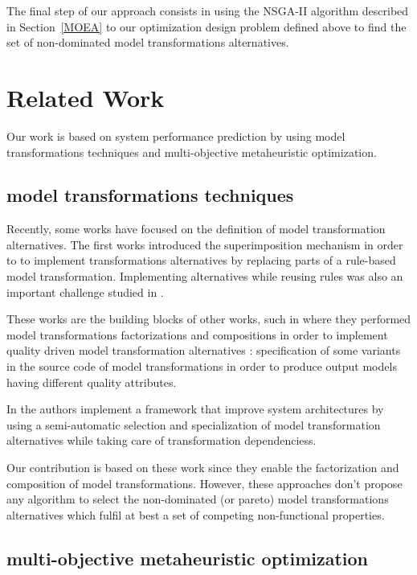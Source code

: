 \documentclass[conference]{IEEEtran}
\begin{document}
The final step of our approach consists in using the NSGA-II algorithm described in Section~\ref{MOEA} to our optimization design problem defined above to find the set of non-dominated model transformations alternatives.

\section{Related Work}
\label{Related}
Our work is based on system performance prediction\cite{1291833} by using model transformations techniques and multi-objective metaheuristic optimization\cite{Coello98acomprehensive}.

\subsection{model transformations techniques}
Recently, some works have focused on the definition of model transformation alternatives. The first works introduced the superimposition mechanism\cite{Navarro:2011:UMT:2041790.2041840} in order to to implement transformations alternatives by replacing parts of a rule-based model transformation. Implementing alternatives while reusing rules was also an important challenge studied in \cite{Kavimandan:2011:MQS:2000259.2000264}. 

These works are the building blocks of other works, such in\cite{Drago:2011} where they performed model transformations factorizations and compositions in order to implement quality driven model transformation alternatives : specification of some variants in the source code of model transformations in order to produce output models having different quality attributes.

In \cite{greg} the authors implement a framework that improve system architectures by using a semi-automatic selection and specialization of model transformation alternatives while taking care of transformation dependenciess.

Our contribution is based on these work since they enable the factorization and composition of model transformations. However, these approaches don't propose any algorithm to select the non-dominated (or pareto) model transformations alternatives which fulfil at best a set of competing non-functional properties.

\subsection{multi-objective metaheuristic optimization}
\end{document}
